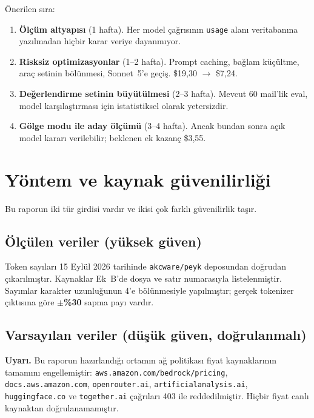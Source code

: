 \documentclass[11pt,a4paper]{article}
\newcommand{\code}[1]{\texttt{\small #1}}
\newenvironment{keybox}
  {\begin{center}\begin{lrbox}{\kbox}\begin{minipage}{0.90\textwidth}\color{ink}\small}
  {\end{minipage}\end{lrbox}\setlength{\fboxsep}{11pt}\colorbox{soft}{\usebox{\kbox}}\end{center}}
\begin{document}
Önerilen sıra:

\begin{enumerate}[leftmargin=1.4em,itemsep=3pt]
  \item \textbf{Ölçüm altyapısı} (1 hafta). Her model çağrısının \code{usage} alanı
        veritabanına yazılmadan hiçbir karar veriye dayanmıyor.
  \item \textbf{Risksiz optimizasyonlar} (1--2 hafta). Prompt caching, bağlam küçültme,
        araç setinin bölünmesi, Sonnet~5'e geçiş. \$19{,}30 $\rightarrow$ \$7{,}24.
  \item \textbf{Değerlendirme setinin büyütülmesi} (2--3 hafta). Mevcut 60 mail'lik eval,
        model karşılaştırması için istatistiksel olarak yetersizdir.
  \item \textbf{Gölge modu ile aday ölçümü} (3--4 hafta). Ancak bundan sonra açık model
        kararı verilebilir; beklenen ek kazanç \$3{,}55.
\end{enumerate}

\section{Yöntem ve kaynak güvenilirliği}

Bu raporun iki tür girdisi vardır ve ikisi çok farklı güvenilirlik taşır.

\subsection{Ölçülen veriler (yüksek güven)}

Token sayıları 15 Eylül 2026 tarihinde \code{akcware/peyk} deposundan doğrudan
çıkarılmıştır. Kaynaklar Ek~B'de dosya ve satır numarasıyla listelenmiştir. Sayımlar
karakter uzunluğunun 4'e bölünmesiyle yapılmıştır; gerçek tokenizer çıktısına göre
\textbf{$\pm$\%30} sapma payı vardır.

\subsection{Varsayılan veriler (düşük güven, doğrulanmalı)}

\begin{keybox}
\textbf{Uyarı.} Bu raporun hazırlandığı ortamın ağ politikası fiyat kaynaklarının
tamamını engellemiştir: \code{aws.amazon.com/bedrock/pricing},
\code{docs.aws.amazon.com}, \code{openrouter.ai}, \code{artificialanalysis.ai},
\code{huggingface.co} ve \code{together.ai} çağrıları 403 ile reddedilmiştir.
Hiçbir fiyat canlı kaynaktan doğrulanamamıştır.
\end{keybox}
\end{document}
